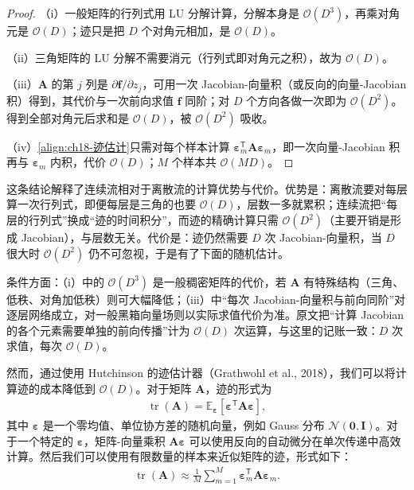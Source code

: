 \documentclass[../../main.tex]{subfiles}
\begin{document}
\begin{proof}
（i）一般矩阵的行列式用 LU 分解计算，分解本身是 $\mathcal{O}(D^{3})$，再乘对角元是 $\mathcal{O}(D)$；迹只是把 $D$ 个对角元相加，是 $\mathcal{O}(D)$。

（ii）三角矩阵的 LU 分解不需要消元（行列式即对角元之积），故为 $\mathcal{O}(D)$。

（iii）$\bm{A}$ 的第 $j$ 列是 $\partial\bm{f}/\partial z_j$，可用一次 Jacobian-向量积（或反向的向量-Jacobian 积）得到，其代价与一次前向求值 $\bm{f}$ 同阶；对 $D$ 个方向各做一次即为 $\mathcal{O}(D^{2})$。得到全部对角元后求和是 $\mathcal{O}(D)$，被 $\mathcal{O}(D^{2})$ 吸收。

（iv）\eqref{align:ch18-迹估计}只需对每个样本计算 $\bm{\varepsilon}_m^{\mathsf T}\bm{A}\bm{\varepsilon}_m$，即一次向量-Jacobian 积再与 $\bm{\varepsilon}_m$ 内积，代价 $\mathcal{O}(D)$；$M$ 个样本共 $\mathcal{O}(MD)$。
\end{proof}

\begin{remark}
这条结论解释了连续流相对于离散流的计算优势与代价。优势是：离散流要对每层算一次行列式，即便每层是三角的也要 $\mathcal{O}(D)$，层数一多就累积；连续流把“每层的行列式”换成“迹的时间积分”，而迹的精确计算只需 $\mathcal{O}(D^{2})$（主要开销是形成 Jacobian），与层数无关。代价是：迹仍然需要 $D$ 次 Jacobian-向量积，当 $D$ 很大时 $\mathcal{O}(D^{2})$ 仍不可忽视，于是有了下面的随机估计。

条件方面：（i）中的 $\mathcal{O}(D^{3})$ 是一般稠密矩阵的代价，若 $\bm{A}$ 有特殊结构（三角、低秩、对角加低秩）则可大幅降低；（iii）中“每次 Jacobian-向量积与前向同阶”对逐层网络成立，对一般黑箱向量场则以实际求值代价为准。原文把“计算 Jacobian 的各个元素需要单独的前向传播”计为 $\mathcal{O}(D)$ 次运算，与这里的记账一致：$D$ 次求值，每次 $\mathcal{O}(D)$。
\end{remark}

然而，通过使用 Hutchinson 的迹估计器（Grathwohl et al., 2018），我们可以将计算迹的成本降低到 $\mathcal{O}(D)$。对于矩阵 $\bm{A}$，迹的形式为
\begin{align}
  \operatorname{tr}(\bm{A})=\mathbb{E}_{\bm{\varepsilon}}\left[\bm{\varepsilon}^{\mathsf T}\bm{A}\bm{\varepsilon}\right],\label{align:ch18-hutchinson}
\end{align}
其中 $\bm{\varepsilon}$ 是一个零均值、单位协方差的随机向量，例如 Gauss 分布 $\mathcal{N}(\bm{0},\bm{I})$。对于一个特定的 $\bm{\varepsilon}$，矩阵-向量乘积 $\bm{A}\bm{\varepsilon}$ 可以使用反向的自动微分在单次传递中高效计算。然后我们可以使用有限数量的样本来近似矩阵的迹，形式如下：
\begin{align}
  \operatorname{tr}(\bm{A})\approx\frac{1}{M}\sum_{m=1}^{M}\bm{\varepsilon}_m^{\mathsf T}\bm{A}\bm{\varepsilon}_m .\label{align:ch18-迹估计}
\end{align}
\end{document}
